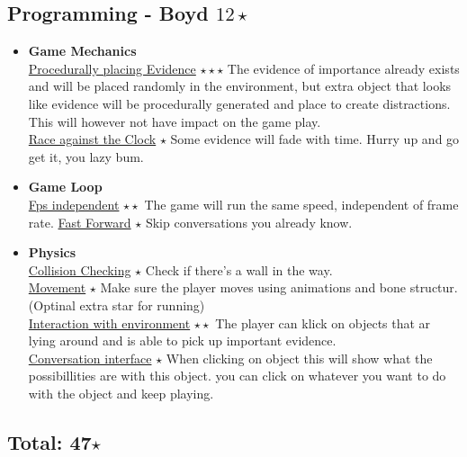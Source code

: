 \documentclass{article}
\begin{document}
		\subsection{Programming - Boyd $12 \star$}
			\begin{itemize}
				\item \textbf{Game Mechanics}\\
					\underline{Procedurally placing Evidence} $\star \star \star$ The evidence of importance already exists and will be placed randomly in the environment, but extra object that looks like evidence will be procedurally generated and place to create distractions. This will however not have impact on the game play.\\
					\underline{Race against the Clock} $\star$ Some evidence will fade with time. Hurry up and go get it, you lazy bum.
				\item \textbf{Game Loop}\\
					\underline{Fps independent} $\star \star$ The game will run the same speed, independent of frame rate.
					\underline{Fast Forward} $\star$ Skip conversations you already know.
				\item \textbf{Physics}\\
					\underline{Collision Checking} $\star$ Check if there's a wall in the way.\\
					\underline{Movement} $\star$ Make sure the player moves using animations and bone structur. (Optinal extra star for running)\\
					\underline{Interaction with environment} $\star \star$ The player can klick on objects that ar lying around and is able to pick up important evidence.\\
					\underline{Conversation interface} $\star$ When clicking on object this will show what the possibillities are with this object. you can click on whatever you want to do with the object and keep playing.
			\end{itemize}

			\subsection*{Total: 47$\star$}

			
\end{document}
